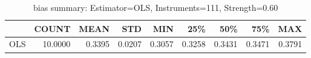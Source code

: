 \begin{table}[ht]
\centering
\caption{bias summary: Estimator=OLS, Instruments=111, Strength=0.60}
\begin{tabular}{lrrrrrrrr}
\toprule
 & COUNT & MEAN & STD & MIN & 25\% & 50\% & 75\% & MAX \\
\midrule
OLS & 10.0000 & 0.3395 & 0.0207 & 0.3057 & 0.3258 & 0.3431 & 0.3471 & 0.3791 \\
\bottomrule
\end{tabular}
\end{table}
